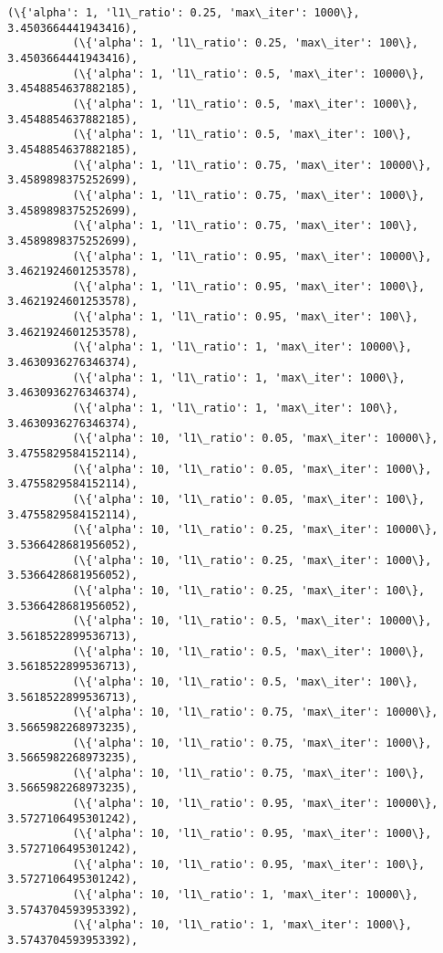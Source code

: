 \documentclass[11pt]{article}
\begin{document}
\begin{Verbatim}[commandchars=\\\{\}]
          (\{'alpha': 1, 'l1\_ratio': 0.25, 'max\_iter': 1000\}, 3.4503664441943416),
          (\{'alpha': 1, 'l1\_ratio': 0.25, 'max\_iter': 100\}, 3.4503664441943416),
          (\{'alpha': 1, 'l1\_ratio': 0.5, 'max\_iter': 10000\}, 3.4548854637882185),
          (\{'alpha': 1, 'l1\_ratio': 0.5, 'max\_iter': 1000\}, 3.4548854637882185),
          (\{'alpha': 1, 'l1\_ratio': 0.5, 'max\_iter': 100\}, 3.4548854637882185),
          (\{'alpha': 1, 'l1\_ratio': 0.75, 'max\_iter': 10000\}, 3.4589898375252699),
          (\{'alpha': 1, 'l1\_ratio': 0.75, 'max\_iter': 1000\}, 3.4589898375252699),
          (\{'alpha': 1, 'l1\_ratio': 0.75, 'max\_iter': 100\}, 3.4589898375252699),
          (\{'alpha': 1, 'l1\_ratio': 0.95, 'max\_iter': 10000\}, 3.4621924601253578),
          (\{'alpha': 1, 'l1\_ratio': 0.95, 'max\_iter': 1000\}, 3.4621924601253578),
          (\{'alpha': 1, 'l1\_ratio': 0.95, 'max\_iter': 100\}, 3.4621924601253578),
          (\{'alpha': 1, 'l1\_ratio': 1, 'max\_iter': 10000\}, 3.4630936276346374),
          (\{'alpha': 1, 'l1\_ratio': 1, 'max\_iter': 1000\}, 3.4630936276346374),
          (\{'alpha': 1, 'l1\_ratio': 1, 'max\_iter': 100\}, 3.4630936276346374),
          (\{'alpha': 10, 'l1\_ratio': 0.05, 'max\_iter': 10000\}, 3.4755829584152114),
          (\{'alpha': 10, 'l1\_ratio': 0.05, 'max\_iter': 1000\}, 3.4755829584152114),
          (\{'alpha': 10, 'l1\_ratio': 0.05, 'max\_iter': 100\}, 3.4755829584152114),
          (\{'alpha': 10, 'l1\_ratio': 0.25, 'max\_iter': 10000\}, 3.5366428681956052),
          (\{'alpha': 10, 'l1\_ratio': 0.25, 'max\_iter': 1000\}, 3.5366428681956052),
          (\{'alpha': 10, 'l1\_ratio': 0.25, 'max\_iter': 100\}, 3.5366428681956052),
          (\{'alpha': 10, 'l1\_ratio': 0.5, 'max\_iter': 10000\}, 3.5618522899536713),
          (\{'alpha': 10, 'l1\_ratio': 0.5, 'max\_iter': 1000\}, 3.5618522899536713),
          (\{'alpha': 10, 'l1\_ratio': 0.5, 'max\_iter': 100\}, 3.5618522899536713),
          (\{'alpha': 10, 'l1\_ratio': 0.75, 'max\_iter': 10000\}, 3.5665982268973235),
          (\{'alpha': 10, 'l1\_ratio': 0.75, 'max\_iter': 1000\}, 3.5665982268973235),
          (\{'alpha': 10, 'l1\_ratio': 0.75, 'max\_iter': 100\}, 3.5665982268973235),
          (\{'alpha': 10, 'l1\_ratio': 0.95, 'max\_iter': 10000\}, 3.5727106495301242),
          (\{'alpha': 10, 'l1\_ratio': 0.95, 'max\_iter': 1000\}, 3.5727106495301242),
          (\{'alpha': 10, 'l1\_ratio': 0.95, 'max\_iter': 100\}, 3.5727106495301242),
          (\{'alpha': 10, 'l1\_ratio': 1, 'max\_iter': 10000\}, 3.5743704593953392),
          (\{'alpha': 10, 'l1\_ratio': 1, 'max\_iter': 1000\}, 3.5743704593953392),

\end{Verbatim}
\end{document}
